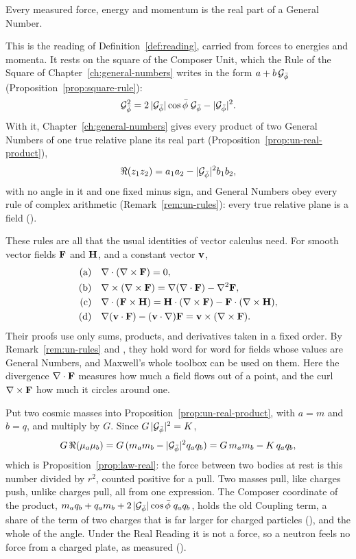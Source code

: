 \begin{definition}\label{def:un-reading}
Every measured force, energy and momentum is the real part of a General Number.
\end{definition}

This is the reading of Definition~\ref{def:reading}, carried from forces to energies and momenta. It rests on the square of the Composer Unit, which the Rule of the Square of Chapter~\ref{ch:general-numbers} writes in the form $a + b\,\mathcal{G}_{\bar{\phi}}$ (Proposition~\ref{prop:square-rule}):
\[
\mathcal{G}_{\bar{\phi}}^2 = 2\,|\mathcal{G}_{\bar{\phi}}|\cos\bar{\phi}\;\mathcal{G}_{\bar{\phi}} - |\mathcal{G}_{\bar{\phi}}|^2 .
\]
With it, Chapter~\ref{ch:general-numbers} gives every product of two General Numbers of one true relative plane its real part (Proposition~\ref{prop:un-real-product}),
\[
\Re(z_1 z_2) = a_1 a_2 - |\mathcal{G}_{\bar{\phi}}|^2 b_1 b_2 ,
\]
with no angle in it and one fixed minus sign, and General Numbers obey every rule of complex arithmetic (Remark~\ref{rem:un-rules}): every true relative plane is a field ().

These rules are all that the usual identities of vector calculus need. For smooth vector fields $\mathbf{F}$ and $\mathbf{H}$, and a constant vector $\mathbf{v}$,
\begin{align*}
\text{(a)}\quad & \nabla\cdot(\nabla\times\mathbf{F}) = 0 ,\\
\text{(b)}\quad & \nabla\times(\nabla\times\mathbf{F}) = \nabla(\nabla\cdot\mathbf{F}) - \nabla^2\mathbf{F} ,\\
\text{(c)}\quad & \nabla\cdot(\mathbf{F}\times\mathbf{H}) = \mathbf{H}\cdot(\nabla\times\mathbf{F}) - \mathbf{F}\cdot(\nabla\times\mathbf{H}) ,\\
\text{(d)}\quad & \nabla(\mathbf{v}\cdot\mathbf{F}) - (\mathbf{v}\cdot\nabla)\mathbf{F} = \mathbf{v}\times(\nabla\times\mathbf{F}) .
\end{align*}
Their proofs use only sums, products, and derivatives taken in a fixed order. By Remark~\ref{rem:un-rules} and , they hold word for word for fields whose values are General Numbers, and Maxwell's whole toolbox can be used on them. Here the divergence $\nabla\cdot\mathbf{F}$ measures how much a field flows out of a point, and the curl $\nabla\times\mathbf{F}$ how much it circles around one.

Put two cosmic masses into Proposition~\ref{prop:un-real-product}, with $a = m$ and $b = q$, and multiply by $G$. Since $G\,|\mathcal{G}_{\bar{\phi}}|^2 = K$,
\[
G\,\Re(\mu_a\mu_b) = G\,(m_a m_b - |\mathcal{G}_{\bar{\phi}}|^2 q_a q_b) = G\,m_a m_b - K\,q_a q_b ,
\]
which is Proposition~\ref{prop:law-real}: the force between two bodies at rest is this number divided by $r^2$, counted positive for a pull. Two masses pull, like charges push, unlike charges pull, all from one expression. The Composer coordinate of the product, $m_a q_b + q_a m_b + 2\,|\mathcal{G}_{\bar{\phi}}|\cos\bar{\phi}\; q_a q_b$, holds the old Coupling term, a share of the term of two charges that is far larger for charged particles (), and the whole of the angle. Under the Real Reading it is not a force, so a neutron feels no force from a charged plate, as measured ().

